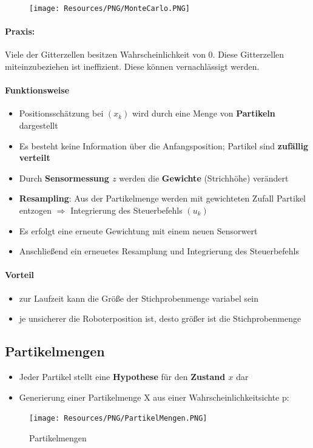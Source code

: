 {
\begin{figure}
	\texttt{[image: Resources/PNG/MonteCarlo.PNG]}
\end{figure}

\paragraph{Praxis:} Viele der Gitterzellen besitzen Wahrscheinlich\-keit von 0.
Diese Gitterzellen miteinzubeziehen ist ineffizient. Diese können vernachlässigt
werden.

\paragraph{Funktionsweise}
\begin{itemize}
	\item Positionsschätzung bei $(x_k)$ wird durch eine Menge von
		\textbf{Partikeln} dargestellt
	\item Es besteht keine Information über die Anfangsposition; Partikel sind
		\textbf{zufällig verteilt}
	\item Durch \textbf{Sensormessung $z$} werden die \textbf{Gewichte}
		(Strichhöhe) verändert
	\item \textbf{Resampling}: Aus der Partikelmenge werden mit gewichteten
	 	Zufall Partikel entzogen  $\Rightarrow$ Integrierung des Steuerbefehls
		$(u_k)$
	\item Es erfolgt eine erneute Gewichtung mit einem neuen Sensorwert
	\item Anschließend ein erneuetes Resamplung und Integrierung des Steuerbefehls
\end{itemize}

}

\paragraph{Vorteil}
\begin{itemize}
	\item zur Laufzeit kann die Größe der Stichprobenmenge variabel sein
	\item je unsicherer die Roboterposition ist, desto größer ist die
		Stichprobenmenge
\end{itemize}

\subsection{Partikelmengen}
\begin{itemize}
	\item Jeder Partikel stellt eine \textbf{Hypothese} für den \textbf{Zustand
		$x$} dar
	\item Generierung einer Partikelmenge X aus einer Wahrscheinlichkeitsichte p:
\end{itemize}
\begin{figure}[H]
	\begin{center}
		\texttt{[image: Resources/PNG/PartikelMengen.PNG]}
		\caption{Partikelmengen}
		\label{fig:PNG/PartikelMengen.PNG}
	\end{center}
\end{figure}

